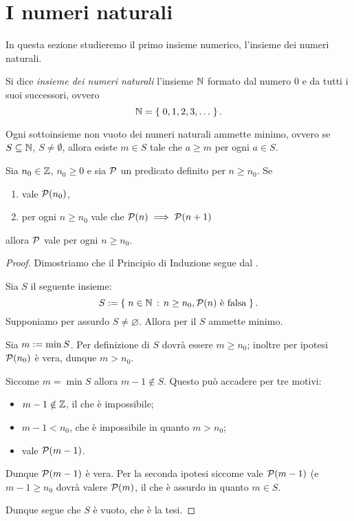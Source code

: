\section{I numeri naturali}

In questa sezione studieremo il primo insieme numerico, l'insieme dei numeri naturali.

\begin{definition}
    Si dice \emph{insieme dei numeri naturali} l'insieme $\mathbb{N}$ formato dal numero $0$ e da tutti i suoi successori, ovvero \begin{equation}
        \mathbb{N} = \left\{\;0, 1, 2, 3, \dots\;\right\}.
    \end{equation}
\end{definition}

\begin{axiom}
     \label{ax:min_intero}Ogni sottoinsieme non vuoto dei numeri naturali ammette minimo, ovvero se $S \subseteq \mathbb{N}$, $S \neq \emptyset$, allora esiste $m \in S$ tale che $a \geq m$ per ogni $a \in S$.
\end{axiom}

\begin{theorem}
     Sia $n_0 \in \mathbb{Z}$, $n_0 \geq 0$ e sia $\mathcal{P}$ un predicato definito per $n \geq n_0$. Se \begin{enumerate}
        \item vale $\mathcal{P}(n_0)$,
        \item per ogni $n \geq n_0$ vale che $\mathcal{P}(n) \implies \mathcal{P}(n+1)$
    \end{enumerate}
    allora $\mathcal{P}$ vale per ogni $n \geq n_0$.
\end{theorem}
\begin{proof}
    Dimostriamo che il Principio di Induzione segue dal .

    Sia $S$ il seguente insieme: \[
        S := \left\{\;n \in \mathbb{N} \,:\, n\geq n_0, \mathcal{P}(n) \text{ è falsa}\;\right\}.    
    \] Supponiamo per assurdo $S \neq \varnothing$. Allora per il  $S$ ammette minimo. 
    
    Sia $m := \min S$. Per definizione di $S$ dovrà essere $m \geq n_0$; inoltre per ipotesi $\mathcal{P}(n_0)$ è vera, dunque $m > n_0$.

    Siccome $m = \min S$ allora $m - 1 \notin S$. Questo può accadere per tre motivi: \begin{itemize}
        \item $m - 1 \notin \mathbb{Z}$, il che è impossibile;
        \item $m - 1 < n_0$, che è impossibile in quanto $m > n_0$;
        \item vale $\mathcal{P}(m-1)$.
    \end{itemize}

    Dunque $\mathcal{P}(m-1)$ è vera. Per la seconda ipotesi siccome vale $\mathcal{P}(m-1)$ (e $m - 1 \geq n_0$ dovrà valere $\mathcal{P}(m)$, il che è assurdo in quanto $m \in S$.

    Dunque segue che $S$ è vuoto, che è la tesi.
\end{proof}

